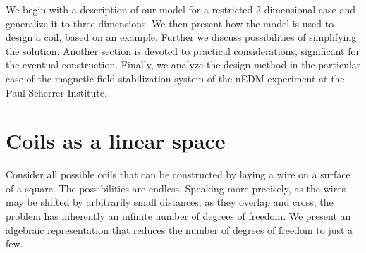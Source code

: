 
We begin with a description of our model for a restricted 2-dimensional case and generalize it to three dimensions. We then present how the model is used to design a coil, based on an example. Further we discuss possibilities of simplifying the solution. Another section is devoted to practical considerations, significant for the eventual construction. Finally, we analyze the design method in the particular case of the magnetic field stabilization system of the nEDM experiment at the Paul Scherrer Institute.



\section{Coils as a linear space}
Consider all possible coils that can be constructed by laying a wire on a surface of a square. The possibilities are endless. Speaking more precisely, as the wires may be shifted by arbitrarily small distances, as they overlap and cross, the problem has inherently an infinite number of degrees of freedom. We present an algebraic representation that reduces the number of degrees of freedom to just a few.

